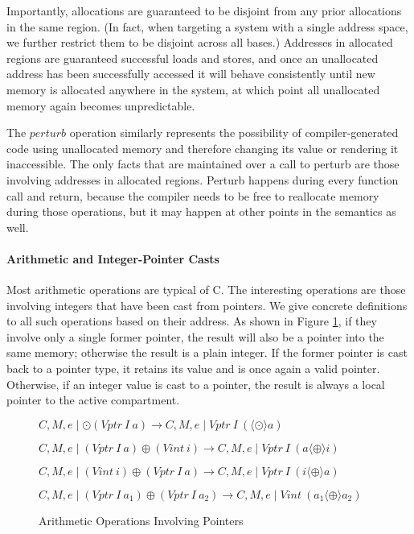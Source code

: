 \documentclass{article}
\begin{document}
Importantly, allocations are guaranteed to be disjoint from any prior allocations in the
same region. (In fact, when targeting a system with a single address space, we further restrict
them to be disjoint across all bases.) Addresses in allocated regions are guaranteed
successful loads and stores, and once an unallocated address has been successfully accessed
it will behave consistently until new memory is allocated anywhere in the system,
at which point all unallocated memory again becomes unpredictable.

The \(\mathit{perturb}\) operation similarly represents the possibility of compiler-generated
code using unallocated memory and therefore changing its value or rendering it inaccessible.
The only facts that are maintained over a call to perturb are those involving addresses in
allocated regions. Perturb happens during every function call and return, because the compiler
needs to be free to reallocate memory during those operations, but it may happen at other
points in the semantics as well.


\paragraph{Arithmetic and Integer-Pointer Casts}

Most arithmetic operations are typical of C. The interesting operations are those
involving integers that have been cast from pointers. We give concrete definitions
to all such operations based on their address. As shown in Figure \ref{fig:arith}, if they
involve only a single former pointer, the result will also be a pointer into the
same memory; otherwise the result is a plain integer. If the former pointer is cast
back to a pointer type, it retains its value and is once again a valid pointer.
Otherwise, if an integer value is cast to a pointer, the result is always a local
pointer to the active compartment.

\begin{figure}
  \judgment[Unop]
           {}
           {\(C,M,e \mid \odot (\mathit{Vptr} ~ I ~ a) \longrightarrow
             C,M,e \mid \mathit{Vptr} ~ I ~ (\langle \odot \rangle a)\)}
           
  \judgment[BinopPointerInteger]
           {}
           {\(C,M,e \mid (\mathit{Vptr} ~ I ~ a) \oplus
             (\mathit{Vint} ~ i) \longrightarrow
             C,M,e \mid \mathit{Vptr} ~ I ~ (a \langle \oplus \rangle i)\)}

  \judgment[BinopIntegerPointer]
           {}
           {\(C,M,e \mid (\mathit{Vint} ~ i) \oplus
             (\mathit{Vptr} ~ I ~ a) \longrightarrow
             C,M,e \mid \mathit{Vptr} ~ I ~ (i \langle \oplus \rangle a)\)}

  \judgment[BinopPointers]
           {}
           {\(C,M,e \mid (\mathit{Vptr} ~ I ~ a_1) \oplus
             (\mathit{Vptr} ~ I ~ a_2) \longrightarrow
             C,M,e \mid \mathit{Vint} ~ (a_1 \langle \oplus \rangle a_2)\)}

  \caption{Arithmetic Operations Involving Pointers}
  \label{fig:arith}
\end{figure}
\end{document}
